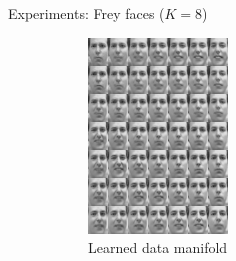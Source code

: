 \documentclass[unicode,11pt]{beamer}
\begin{document}
\begin{frame}[fragile]{Experiments: Frey faces ($K = 8$)}
  \begin{figure}
    \centering
    \begin{subfigure}[b]{.4\linewidth}
      \centering
      \includegraphics[width=.8\linewidth]{images/nf_frey_B400_E8000_N560_L2_H200_F8_C_manifold_8}
      \caption{Learned data manifold}
    \end{subfigure}
    \hspace{1em}
    \begin{subfigure}[b]{.4\linewidth}
      \centering

\end{subfigure}
\end{figure}
\end{frame}
\end{document}
